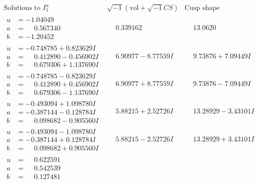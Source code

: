 \documentclass[1p]{elsarticle_modified}
\theoremstyle{definition}
\newcommand{\I}{\sqrt{-1}}
\begin{document}
$$\begin{array}{c|c|c}  
\text{Solutions to }I^u_{1}& \I (\text{vol} + \sqrt{-1}CS) & \text{Cusp shape}\\
 \hline 
\begin{aligned}
u &= -1.04049\phantom{ +0.000000I} \\
a &= \phantom{-}0.567340\phantom{ +0.000000I} \\
b &= -1.20452\phantom{ +0.000000I}\end{aligned}
 & \phantom{-}0.339162\phantom{ +0.000000I} & \phantom{-}13.0620\phantom{ +0.000000I} \\ \hline\begin{aligned}
u &= -0.748785 + 0.823629 I \\
a &= \phantom{-}0.412890 - 0.456902 I \\
b &= \phantom{-}0.679306 + 1.137690 I\end{aligned}
 & \phantom{-}6.90977 - 8.77559 I & \phantom{-}9.73876 + 7.09449 I \\ \hline\begin{aligned}
u &= -0.748785 - 0.823629 I \\
a &= \phantom{-}0.412890 + 0.456902 I \\
b &= \phantom{-}0.679306 - 1.137690 I\end{aligned}
 & \phantom{-}6.90977 + 8.77559 I & \phantom{-}9.73876 - 7.09449 I \\ \hline\begin{aligned}
u &= -0.493094 + 1.098780 I \\
a &= -0.387144 - 0.128784 I \\
b &= \phantom{-}0.098682 - 0.905560 I\end{aligned}
 & \phantom{-}5.88215 + 2.52726 I & \phantom{-}13.28929 - 3.43101 I \\ \hline\begin{aligned}
u &= -0.493094 - 1.098780 I \\
a &= -0.387144 + 0.128784 I \\
b &= \phantom{-}0.098682 + 0.905560 I\end{aligned}
 & \phantom{-}5.88215 - 2.52726 I & \phantom{-}13.28929 + 3.43101 I \\ \hline\begin{aligned}
u &= \phantom{-}0.622591\phantom{ +0.000000I} \\
a &= \phantom{-}0.542539\phantom{ +0.000000I} \\
b &= \phantom{-}0.127481\phantom{ +0.000000I}\end{aligned}

\end{array}$$
\end{document}

